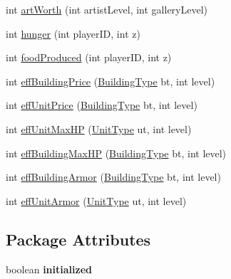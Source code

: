 \begin{CompactItemize}
\item 
int \hyperlink{classBaseAI_9a6e10da16c3b209915251ca183815e7}{artWorth} (int artistLevel, int galleryLevel)
\item 
int \hyperlink{classBaseAI_e1677c15b8b022dd7335eeb84b57b30f}{hunger} (int playerID, int z)
\item 
int \hyperlink{classBaseAI_43314f174d849c294ec84a09af6b55e2}{foodProduced} (int playerID, int z)
\item 
int \hyperlink{classBaseAI_d49ab218e79412c1ce975159688e6cfd}{effBuildingPrice} (\hyperlink{classBuildingType}{BuildingType} bt, int level)
\item 
int \hyperlink{classBaseAI_5995a3d005840158948db900a312092c}{effUnitPrice} (\hyperlink{classBuildingType}{BuildingType} bt, int level)
\item 
int \hyperlink{classBaseAI_0977f4ba22e8b97f89d7b0c03941c788}{effUnitMaxHP} (\hyperlink{classUnitType}{UnitType} ut, int level)
\item 
int \hyperlink{classBaseAI_2f6a6c6f1da75c203de7e1b1abe7bed1}{effBuildingMaxHP} (\hyperlink{classBuildingType}{BuildingType} bt, int level)
\item 
int \hyperlink{classBaseAI_1de8bdc9274ca62632b9fb7caf55800e}{effBuildingArmor} (\hyperlink{classBuildingType}{BuildingType} bt, int level)
\item 
int \hyperlink{classBaseAI_b08916c060ca84af1c0ba12e8ec9d54c}{effUnitArmor} (\hyperlink{classUnitType}{UnitType} ut, int level)
\end{CompactItemize}
\subsection*{Package Attributes}
\begin{CompactItemize}
\item 
\hypertarget{classBaseAI_94966bbfdac0d091a7332f19b29935c3}{
boolean \textbf{initialized}}
\label{classBaseAI_94966bbfdac0d091a7332f19b29935c3}

\end{CompactItemize}
